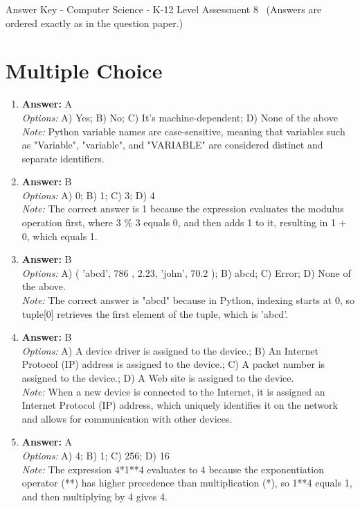 \documentclass[12pt]{article}
\begin{document}
\begin{center}
Answer Key - Computer Science - K-12 Level Assessment 8 \
\small (Answers are ordered exactly as in the question paper.)
\end{center}

\section*{Multiple Choice}
\begin{enumerate}[label=\arabic*.]
\item \textbf{Answer:} A
\\ \textit{Options:} A) Yes; B) No; C) It's machine-dependent; D) None of the above
\\ \textit{Note:} Python variable names are case-sensitive, meaning that variables such as "Variable", "variable", and "VARIABLE" are considered distinct and separate identifiers.
\item \textbf{Answer:} B
\\ \textit{Options:} A) 0; B) 1; C) 3; D) 4
\\ \textit{Note:} The correct answer is 1 because the expression evaluates the modulus operation first, where 3 \% 3 equals 0, and then adds 1 to it, resulting in 1 + 0, which equals 1.
\item \textbf{Answer:} B
\\ \textit{Options:} A) ( 'abcd', 786 , 2.23, 'john', 70.2 ); B) abcd; C) Error; D) None of the above.
\\ \textit{Note:} The correct answer is "abcd" because in Python, indexing starts at 0, so tuple[0] retrieves the first element of the tuple, which is 'abcd'.
\item \textbf{Answer:} B
\\ \textit{Options:} A) A device driver is assigned to the device.; B) An Internet Protocol (IP) address is assigned to the device.; C) A packet number is assigned to the device.; D) A Web site is assigned to the device.
\\ \textit{Note:} When a new device is connected to the Internet, it is assigned an Internet Protocol (IP) address, which uniquely identifies it on the network and allows for communication with other devices.
\item \textbf{Answer:} A
\\ \textit{Options:} A) 4; B) 1; C) 256; D) 16
\\ \textit{Note:} The expression 4*1**4 evaluates to 4 because the exponentiation operator (**) has higher precedence than multiplication (*), so 1**4 equals 1, and then multiplying by 4 gives 4.
\end{enumerate}
\end{document}
